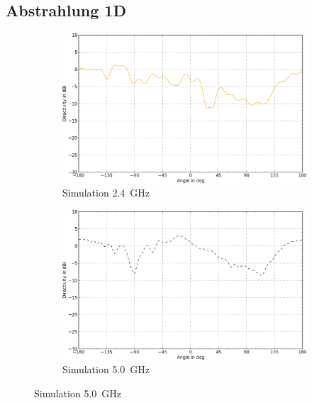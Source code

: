 \clearpage
\subsection{Abstrahlung 1D}

\begin{figure}[h!]
	\centering
	\begin{subfigure}[b]{0.48\textwidth}
		\includegraphics[width=1\textwidth]{../fig/plt/crazy_stuff_l4_pcb_v2c_laptop_1a_105_2ghz4_eabs_phi90-trim.png}
		\caption{Simulation \SI{2.4}{\giga\hertz}}
	\end{subfigure}
	\begin{subfigure}[b]{0.48\textwidth}
		\includegraphics[width=1\textwidth]{../fig/plt/crazy_stuff_l4_pcb_v2c_laptop_1a_105_5ghz0_eabs_phi90-trim.png}
		\caption{Simulation \SI{5.0}{\giga\hertz}}
	\end{subfigure}


\end{figure}
